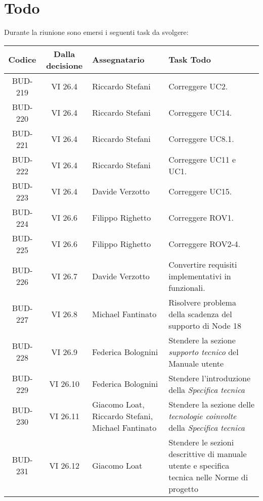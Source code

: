 
\section{Todo}

Durante la riunione sono emersi i seguenti task da svolgere:

\vspace{0.5cm}

\begin{table}[htbp]
\centering
{}
\begin{tabular}{|c|c|p{}|p{}|}
    \hline
    \rowcolor[gray]{0.75}
    \textbf{Codice} & \textbf{Dalla decisione} & \textbf{Assegnatario} & \textbf{Task Todo} \\
    \hline
    BUD-219 & VI 26.4 & Riccardo Stefani & Correggere UC2. \\
    \hline
    BUD-220 & VI 26.4 & Riccardo Stefani & Correggere UC14. \\
    \hline
    BUD-221 & VI 26.4 & Riccardo Stefani & Correggere UC8.1. \\
    \hline
    BUD-222 & VI 26.4 & Riccardo Stefani & Correggere UC11 e UC1. \\
    \hline
    BUD-223 & VI 26.4 & Davide Verzotto & Correggere UC15. \\
    \hline
    BUD-224 & VI 26.6 & Filippo Righetto & Correggere ROV1. \\
    \hline
    BUD-225 & VI 26.6 & Filippo Righetto & Correggere ROV2-4. \\
    \hline
    BUD-226 & VI 26.7 & Davide Verzotto & Convertire requisiti implementativi in funzionali. \\
    \hline
    BUD-227 & VI 26.8 & Michael Fantinato & Risolvere problema della scadenza del supporto di Node 18 \\
    \hline
    BUD-228 & VI 26.9 & Federica Bolognini & Stendere la sezione \emph{supporto tecnico}  del Manuale utente \\
    \hline
    BUD-229 & VI 26.10 & Federica Bolognini & Stendere l'introduzione  della \emph{Specifica tecnica} \\
    \hline
    BUD-230 & VI 26.11 & Giacomo Loat, Riccardo Stefani, Michael Fantinato & Stendere la sezione delle \emph{tecnologie coinvolte}  della \emph{Specifica tecnica} \\
    \hline
    BUD-231 & VI 26.12 & Giacomo Loat & Stendere le sezioni descrittive di manuale utente e specifica tecnica nelle Norme di progetto \\

\end{tabular}
\end{table}
